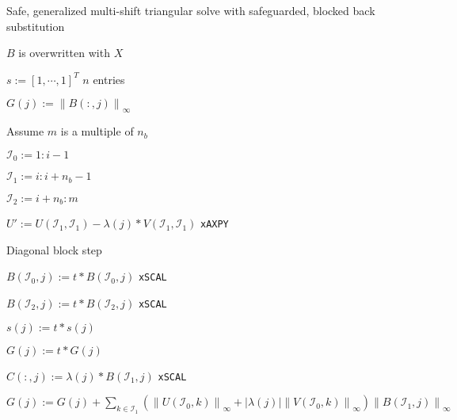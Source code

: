 \documentclass{article}
\begin{document}
\begin{algorithm}[H]
  \caption{Safe, generalized multi-shift triangular solve with
    safeguarded, blocked back substitution }
  \label{algorithm:safe generalized multi-shift trsm}
  \begin{algorithmic}
    \Comment \parbox[t]{0.13\linewidth}{\(B\) is overwritten with \(X\)}

    \State \(s := \left[1, \cdots, 1 \right]^T\) \Comment \(n\) entries


    \State \( G(j) := \left\lVert B(:,j) \right\rVert_\infty\)

    \EndFor

     \Comment Assume \(m\) is a multiple of
    \(n_b\)

    \State \( \mathcal{I}_0 := 1:i-1 \)

    \State \( \mathcal{I}_1 := i:i+n_b-1\)

    \State \( \mathcal{I}_2 := i+n_b:m\)
    

    \State \(U' := U(\mathcal{I}_1, \mathcal{I}_1) - \lambda(j) * V(\mathcal{I}_1, \mathcal{I}_1)\) \Comment\texttt{xAXPY}

    \State {} 
    \Comment Diagonal block step


    \State \(B(\mathcal{I}_0,j) := t*B(\mathcal{I}_0,j)\) \Comment \texttt{xSCAL}

    \State \(B(\mathcal{I}_2,j) := t*B(\mathcal{I}_2,j)\) \Comment \texttt{xSCAL}

    \State \(s(j) := t * s(j)\)

    \State \(G(j) := t * G(j)\)

    \EndIf

    \State \(C(:,j) := \lambda(j) * B(\mathcal{I}_1,j)\) \Comment \texttt{xSCAL}

    \EndFor


    \State \(G(j) := G(j) + \sum_{k\in \mathcal{I}_1} \left( \left\lVert U(\mathcal{I}_0,k) \right\rVert_{\infty} + \left| \lambda(j)\right|  {\left\lVert V(\mathcal{I}_0,k)\right\rVert}_\infty \right) \left\lVert B(\mathcal{I}_1,j) \right\rVert_\infty \)



\end{algorithmic}
\end{algorithm}
\end{document}
